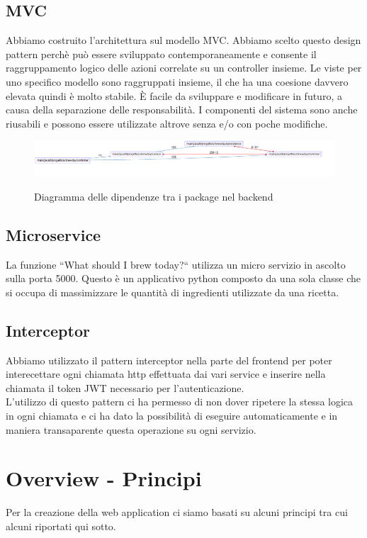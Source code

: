 \documentclass{article}
\begin{document}
\subsection{MVC}
Abbiamo costruito l'architettura sul modello MVC. Abbiamo scelto questo design pattern perchè può essere sviluppato contemporaneamente e consente il raggruppamento logico delle azioni correlate su un controller insieme. Le viste per uno specifico modello sono raggruppati insieme, il che ha una coesione davvero elevata quindi è molto stabile. È facile da sviluppare e modificare in futuro, a causa della separazione delle responsabilità. I componenti del sistema sono anche riusabili e possono essere utilizzate altrove senza e/o con poche modifiche.
\begin{figure}[h!]
\centering
\includegraphics[scale=0.5]{ArchInternalDependencies-brewday.png}
\label{fig:Diagramma delle dipendenze tra i package nel backend}
\caption{Diagramma delle dipendenze tra i package nel backend}
\end{figure}
\subsection{Microservice}
La funzione “What should I brew today?“ utilizza un micro servizio in ascolto sulla porta 5000. Questo è un applicativo python composto da una sola classe che si occupa di massimizzare le quantità di ingredienti utilizzate da una ricetta.
\subsection{Interceptor}
Abbiamo utilizzato il pattern interceptor nella parte del frontend per poter interecettare ogni chiamata http effettuata dai vari service e inserire nella chiamata il token JWT necessario per l’autenticazione.\\
L’utilizzo di questo pattern ci ha permesso di non dover ripetere la stessa logica in ogni chiamata e ci ha dato la possibilità di eseguire automaticamente e in maniera transaparente questa operazione su ogni servizio.  \\
\section{Overview - Principi}
Per la creazione della web application ci siamo basati su alcuni principi tra cui alcuni riportati qui sotto.
\end{document}
